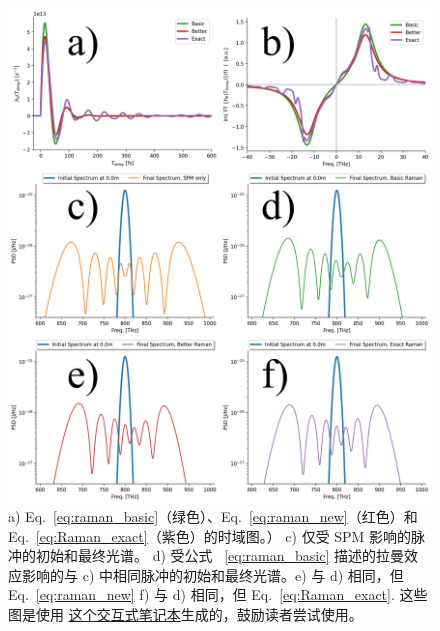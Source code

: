 \begin{figure}
    \centering
    \includegraphics[width=1\linewidth]{figures/Raman_combined.png}
    \caption{a) Eq.~\ref{eq:raman_basic}（绿色）、Eq.~\ref{eq:raman_new}（红色）和 Eq.~\ref{eq:Raman_exact}（紫色）的时域图。） c) 仅受 SPM 影响的脉冲的初始和最终光谱。 d) 受公式 ~\ref{eq:raman_basic} 描述的拉曼效应影响的与 c) 中相同脉冲的初始和最终光谱。e) 与 d) 相同，但 Eq.~\ref{eq:raman_new} f) 与 d) 相同，但 Eq.~\ref{eq:Raman_exact}. 这些图是使用 \href{https://colab.research.google.com/drive/1TqixCGQ51DVwpB3VA6J1XQCpDcf4xwb4?usp=sharing}{这个交互式笔记本}生成的，鼓励读者尝试使用。}
    \label{fig:raman_combined}
\end{figure}




